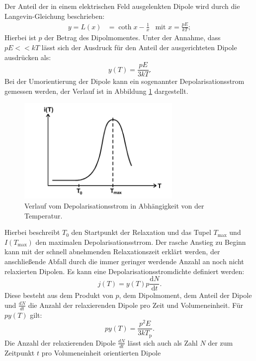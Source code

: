 Der Anteil der in einem elektrischen Feld ausgelenkten Dipole wird durch die Langevin-Gleichung beschrieben:
\begin{align}
  y=L(x)&=\coth{x}-\frac{1}{x}   &\text{mit}\,\, x=\frac{pE}{kT};
\end{align}
Hierbei ist $p$ der Betrag des Dipolmomentes. Unter der Annahme, dass $pE<<kT$ lässt sich der Ausdruck
für den Anteil der ausgerichteten Dipole ausdrücken als:
\begin{equation}
  y(T)=\frac{pE}{3kT}.
\end{equation}
Bei der Umorientierung der Dipole kann ein sogenannter Depolarisationsstrom gemessen werden, der Verlauf
ist in Abbildung \ref{fig:strom} dargestellt.
\begin{figure}
    \centering
    \includegraphics[width=0.7\textwidth]{strom.PNG}
    \caption{Verlauf vom Depolarisationsstrom in Abhängigkeit von der Temperatur.\cite{skript}}
    \label{fig:strom}
\end{figure}
\FloatBarrier
Hierbei beschreibt $T_\mathrm{0}$ den Startpunkt der Relaxation und das
Tupel $T_\mathrm{max}$ und $I(T_\mathrm{max})$ den maximalen Depolarisationsstrrom.
Der rasche Anstieg zu Beginn kann mit der schnell abnehmenden Relaxationszeit erklärt werden,
der anschließende Abfall durch die immer geringer werdende Anzahl an noch nicht relaxierten Dipolen.
Es kann eine Depolarisationsstromdichte definiert werden:
\begin{equation}
  j(T)=y(T)p\frac{\mathrm{d}N}{\mathrm{d}t}\label{eqn:stromdichte}.
\end{equation}
Diese besteht aus dem Produkt von $p$, dem Dipolmoment, dem
Anteil der Dipole und $\frac{dN}{dt}$
die Anzahl der relaxierenden Dipole pro Zeit und Volumeneinheit.
Für $py(T)$ gilt:
\begin{equation}
py(T)=\frac{p^2E}{3kT_\mathrm{p}}.\label{eqn:prod}
\end{equation}
Die Anzahl der relaxierenden Dipole $\frac{dN}{dt}$ lässt sich auch als Zahl $N$ der zum Zeitpunkt $t$ pro Volumeneinheit orientierten Dipole

